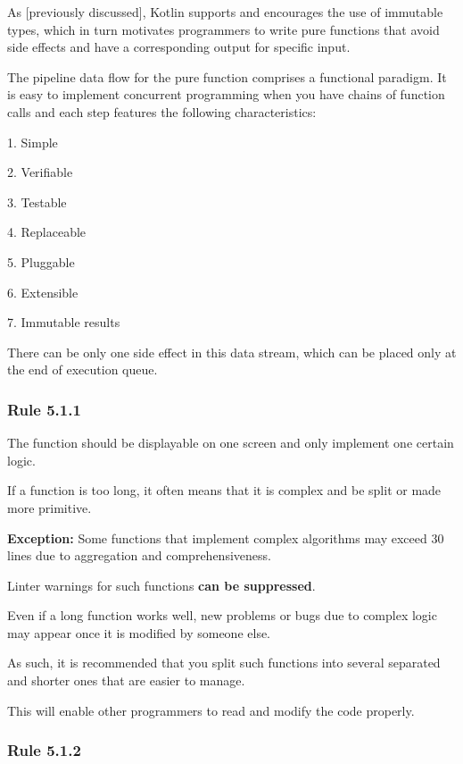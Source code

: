 {{{{As [previously discussed], Kotlin supports and encourages the use of immutable types, which in turn motivates programmers to write pure functions that avoid side effects and have a corresponding output for specific input.

The pipeline data flow for the pure function comprises a functional paradigm. It is easy to implement concurrent programming when you have chains of function calls and each step features the following characteristics:

1.	Simple

2.	Verifiable

3.	Testable

4.	Replaceable

5.	Pluggable

6.	Extensible

7.	Immutable results



There can be only one side effect in this data stream, which can be placed only at the end of execution queue.



\subsubsection*{\textbf{Rule 5.1.1}}
\leavevmode\newline



The function should be displayable on one screen and only implement one certain logic.

If a function is too long, it often means that it is complex and be split or made more primitive.



\textbf{Exception:} Some functions that implement complex algorithms may exceed 30 lines due to aggregation and comprehensiveness.

Linter warnings for such functions \textbf{can be suppressed}.



Even if a long function works well, new problems or bugs due to complex logic may appear once it is modified by someone else.

As such, it is recommended that you split such functions into several separated and shorter ones that are easier to manage.

This will enable other programmers to read and modify the code properly.



\subsubsection*{\textbf{Rule 5.1.2}}
\leavevmode\newline



}}}}
